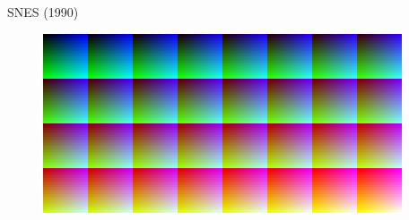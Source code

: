 \documentclass{beamer}
\begin{document}
\begin{darkframes}
\begin{frame}{SNES (1990)}
\begin{multicols}{2}
\begin{figure}[h!]
        \end{figure}
        \begin{figure}[h!]
            \centering
            \includegraphics[height=.2\textheight]{snes_palette}
        \end{figure}
    \end{multicols}
\end{frame}


\end{darkframes}
\end{document}

